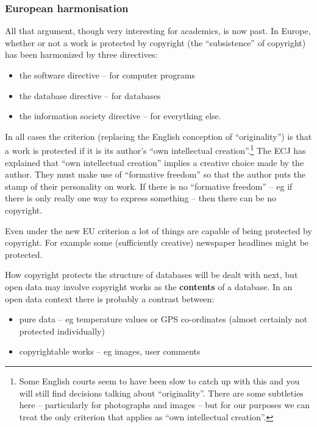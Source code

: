 \subsubsection{European harmonisation}\label{european-harmonisation}

All that argument, though very interesting for academics, is now past.
In Europe, whether or not a work is protected by copyright (the
``subsistence'' of copyright) has been harmonized by three directives:

\begin{itemize}
\item
  the software directive -- for computer programs
\item
  the database directive -- for databases
\item
  the information society directive -- for everything else.
\end{itemize}

In all cases the criterion (replacing the English conception of
``originality'') is that a work is protected if it is its author's ``own
intellectual creation''.\footnote{Some English courts seem to have been
  slow to catch up with this and you will still find decisions talking
  about ``originality''. There are some subtleties here -- particularly
  for photographs and images -- but for our purposes we can treat the
  only criterion that applies as ``own intellectual creation''.} The ECJ
has explained that ``own intellectual creation'' implies a creative
choice made by the author. They must make use of ``formative freedom''
so that the author puts the stamp of their personality on work. If there
is no ``formative freedom'' -- eg if there is only really one way to
express something -- then there can be no copyright.

Even under the new EU criterion a lot of things are capable of being
protected by copyright. For example some (sufficiently creative)
newspaper headlines might be protected.

How copyright protects the structure of databases will be dealt with
next, but open data may involve copyright works as the \textbf{contents}
of a database. In an open data context there is probably a contrast
between:

\begin{itemize}
\item
  pure data -- eg temperature values or GPS co-ordinates (almost
  certainly not protected individually)
\item
  copyrightable works -- eg images, user comments
\end{itemize}

